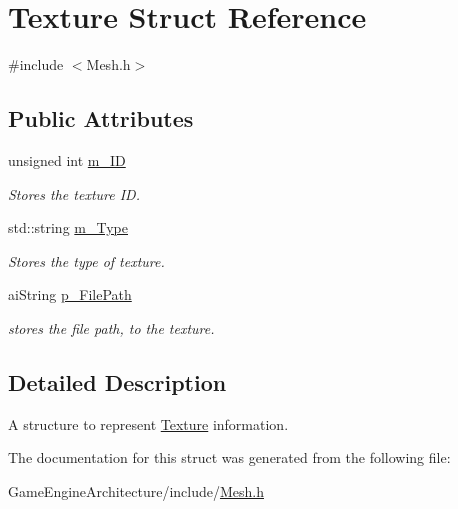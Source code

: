 \hypertarget{struct_texture}{}\section{Texture Struct Reference}
\label{struct_texture}


{\ttfamily \#include $<$Mesh.\+h$>$}

\subsection*{Public Attributes}
\begin{DoxyCompactItemize}
\item 
\mbox{\label{struct_texture_adc7d177537708975e58494a5270ed4c1}} 
unsigned int \mbox{\hyperlink{struct_texture_adc7d177537708975e58494a5270ed4c1}{m\+\_\+\+ID}}
\begin{DoxyCompactList}\small\item\em Stores the texture ID. \end{DoxyCompactList}\item 
\mbox{\label{struct_texture_a9de86e95a2e6bb339a8b5b0f5eda06c3}} 
std\+::string \mbox{\hyperlink{struct_texture_a9de86e95a2e6bb339a8b5b0f5eda06c3}{m\+\_\+\+Type}}
\begin{DoxyCompactList}\small\item\em Stores the type of texture. \end{DoxyCompactList}\item 
\mbox{\label{struct_texture_a6f7898deca29accf504d9a65298eae20}} 
ai\+String \mbox{\hyperlink{struct_texture_a6f7898deca29accf504d9a65298eae20}{p\+\_\+\+File\+Path}}
\begin{DoxyCompactList}\small\item\em stores the file path, to the texture. \end{DoxyCompactList}\end{DoxyCompactItemize}


\subsection{Detailed Description}
A structure to represent \mbox{\hyperlink{struct_texture}{Texture}} information. 

The documentation for this struct was generated from the following file\+:\begin{DoxyCompactItemize}
\item 
Game\+Engine\+Architecture/include/\mbox{\hyperlink{_mesh_8h}{Mesh.\+h}}\end{DoxyCompactItemize}
